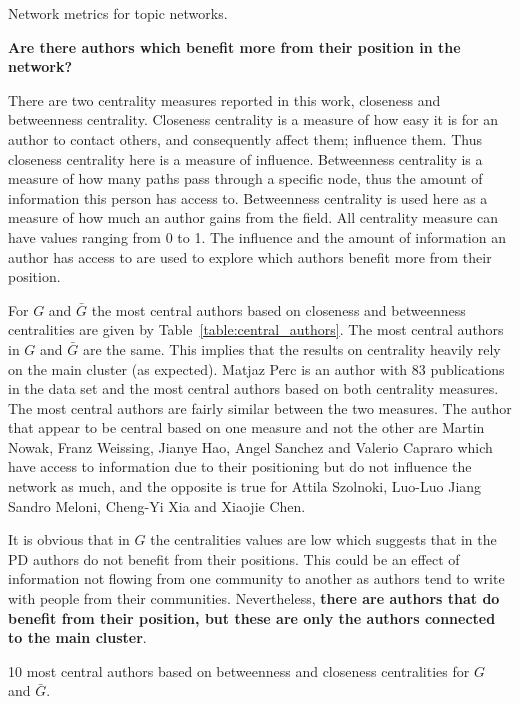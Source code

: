 \documentclass{article}
\theoremstyle{definition}
\begin{document}
\begin{table}[H]
    \centering
    \resizebox{\textwidth}{!}{
    }
    \caption{Network metrics for topic networks.}\label{table:topics_networks}
\end{table}

\textbf{Are there authors which benefit more from their position in the network?}

There are two centrality measures reported in this work, closeness and
betweenness centrality. Closeness centrality is a measure of how easy it is for
an author to contact others, and consequently affect them; influence them. Thus
closeness centrality here is a measure of influence. Betweenness centrality is a
measure of how many paths pass through a specific node, thus the amount of
information this person has access to. Betweenness centrality is used here as a
measure of how much an author gains from the field. All centrality measure can
have values ranging from 0 to 1. The influence and the amount of information
an author has access to are used to explore which authors benefit more
from their position.

For \(G\) and \(\bar{G}\) the most central authors based on closeness and
betweenness centralities are given by Table~\ref{table:central_authors}. The
most central authors in \(G\) and \(\bar{G}\) are the same. This implies that
the results on centrality heavily rely on the main cluster (as expected). Matjaz Perc is an
author with 83 publications in the data set and the most central authors based
on both centrality measures. The most central authors are fairly similar between
the two measures. The author that appear to be central based on one measure and
not the other are Martin Nowak, Franz Weissing, Jianye Hao, Angel Sanchez and
Valerio Capraro which have access to information due to their
positioning but do not influence the network as much, and the opposite is true
for Attila Szolnoki, Luo-Luo Jiang Sandro Meloni, Cheng-Yi Xia and Xiaojie Chen.

It is obvious that in \(G\) the centralities values are low which suggests
that in the PD authors do not benefit from their positions. This could be an
effect of information not flowing from one community to another as authors tend
to write with people from their communities. Nevertheless,
\textbf{there are authors that do benefit from their position, but these are
only the authors connected to the main cluster}.

\begin{table}[!hbtp]
    \begin{center}
    \resizebox{.9\textwidth}{!}{}
\end{center}
\caption{10 most central authors based on betweenness and closeness centralities
for \(G\) and \(\bar{G}\).}\label{table:central_authors}
\end{table}
\end{document}
